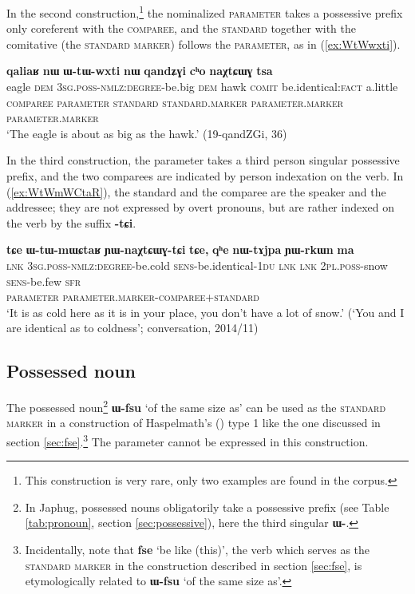 \documentclass[oneside,a4paper,11pt]{article}
\newcommand{\ipa}[1]{{\phon\textbf{#1}}}
\newcommand{\forme}[2]{\ipa{#1} `#2'}
\begin{document}
In the second construction,\footnote{This construction is very rare, only two examples are found in the corpus.} the nominalized \textsc{parameter} takes a possessive prefix only coreferent with the \textsc{comparee}, and the \textsc{standard}  together with the comitative (the \textsc{standard marker}) follows the \textsc{parameter}, as in (\ref{ex:WtWwxti}).

\begin{exe}
\ex \label{ex:WtWwxti}
\glll
\ipa{qaliaʁ} 	\ipa{nɯ} 	\ipa{ɯ-tɯ-wxti} 	\ipa{nɯ} 	\ipa{qandʑɣi} 	\ipa{cʰo} 	\ipa{naχtɕɯɣ} 	\ipa{tsa} 	\\
eagle \textsc{dem} \textsc{3sg.poss-nmlz:degree}-be.big \textsc{dem} hawk \textsc{comit} be.identical:\textsc{fact} a.little  \\
{\textsc{comparee}} { } \textsc{parameter} { } {\textsc{standard}} \textsc{standard.marker} \textsc{parameter.marker}  \textsc{parameter.marker} \\
\glt `The eagle is about as big as the hawk.' (19-qandZGi, 36)
\end{exe}

In the third construction, the parameter takes a third person singular possessive prefix, and the two comparees are indicated by person indexation on the verb. In (\ref{ex:WtWmWCtaR}), the standard and the comparee are the speaker and the addressee; they are not expressed by overt pronouns, but are rather indexed on the verb by the suffix \ipa{-tɕi}.

\begin{exe}
\ex \label{ex:WtWmWCtaR}
\glll
\ipa{tɕe} 	\ipa{ɯ-tɯ-mɯɕtaʁ} 	\ipa{ɲɯ-naχtɕɯɣ-tɕi} 	\ipa{tɕe,} 	\ipa{qʰe} 	\ipa{nɯ-tɤjpa} 	\ipa{ɲɯ-rkɯn} 	\ipa{ma} \\
\textsc{lnk} \textsc{3sg.poss-nmlz:degree}-be.cold \textsc{sens}-be.identical-\textsc{1du} \textsc{lnk} \textsc{lnk} \textsc{2pl.poss}-snow \textsc{sens}-be.few \textsc{sfr} \\
{ } \textsc{parameter} \textsc{parameter.marker-comparee+standard} \\
\glt `It is as cold here as it is in your place, you don't have a lot of snow.' (`You and I are identical as to coldness'; conversation, 2014/11)
\end{exe}



\subsection{Possessed noun} \label{sec:Wfsu}
The possessed noun\footnote{In Japhug, possessed nouns obligatorily take a possessive prefix (see Table \ref{tab:pronoun}, section \ref{sec:possessive}), here the third singular \ipa{ɯ-}. } \forme{ɯ-fsu}{of the same size as} can be used as the \textsc{standard marker} in a construction of Haspelmath's (\citeyear{haspelmath17equative}) type 1 like the one discussed in section \ref{sec:fse}.\footnote{Incidentally, note that \forme{fse}{be like (this)}, the verb which serves as the \textsc{standard marker} in the construction described in section \ref{sec:fse}, is etymologically related to \forme{ɯ-fsu}{of the same size as}.} The parameter cannot be expressed in this construction.
\end{document}
